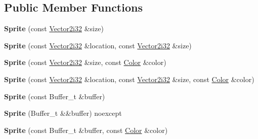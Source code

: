 \subsection*{Public Member Functions}
\begin{DoxyCompactItemize}
\item 
\mbox{\label{classmonsterbattle_1_1Sprite_a894757b3932800a98207f2bc2afad072}} 
{\bfseries Sprite} (const \hyperlink{structmonsterbattle_1_1Vector}{Vector2i32} \&size)
\item 
\mbox{\label{classmonsterbattle_1_1Sprite_ad36cea8490dbc6f44fb820c1e044bdd0}} 
{\bfseries Sprite} (const \hyperlink{structmonsterbattle_1_1Vector}{Vector2i32} \&location, const \hyperlink{structmonsterbattle_1_1Vector}{Vector2i32} \&size)
\item 
\mbox{\label{classmonsterbattle_1_1Sprite_a57e8e2903852fbd9b93e0fac6b6cae97}} 
{\bfseries Sprite} (const \hyperlink{structmonsterbattle_1_1Vector}{Vector2i32} \&size, const \hyperlink{structmonsterbattle_1_1Color}{Color} \&color)
\item 
\mbox{\label{classmonsterbattle_1_1Sprite_a74af85a92941f121cb7c9b3b9a5f277a}} 
{\bfseries Sprite} (const \hyperlink{structmonsterbattle_1_1Vector}{Vector2i32} \&location, const \hyperlink{structmonsterbattle_1_1Vector}{Vector2i32} \&size, const \hyperlink{structmonsterbattle_1_1Color}{Color} \&color)
\item 
\mbox{\label{classmonsterbattle_1_1Sprite_a26fa1fd50c144781db7c734af870e703}} 
{\bfseries Sprite} (const Buffer\+\_\+t \&buffer)
\item 
\mbox{\label{classmonsterbattle_1_1Sprite_a07940c9e699e7e97576cf69774618015}} 
{\bfseries Sprite} (Buffer\+\_\+t \&\&buffer) noexcept
\item 
\mbox{\label{classmonsterbattle_1_1Sprite_a51ad14f21fa4efd8fec78e3408691541}} 
{\bfseries Sprite} (const Buffer\+\_\+t \&buffer, const \hyperlink{structmonsterbattle_1_1Color}{Color} \&color)
\item 
\mbox{\label{classmonsterbattle_1_1Sprite_a36275be8c12922ef9a83d977e68dcd93}} 

\end{DoxyCompactItemize}
